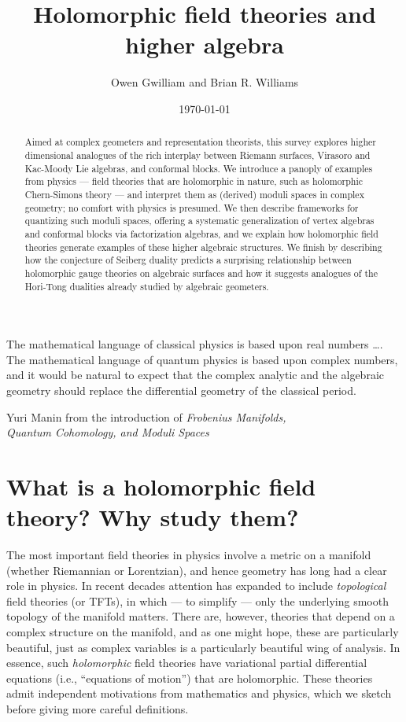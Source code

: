 \documentclass[11pt]{amsart}
\author{Owen Gwilliam and Brian R. Williams}
\date{\today}
\title{Holomorphic field theories and higher algebra}
\begin{document}

\maketitle

\epigraph{The mathematical language of classical physics is based upon real numbers \dots. The mathematical language of quantum physics is based upon complex numbers, and it would be natural to expect that the complex analytic and the algebraic geometry should replace the differential geometry of the classical period.}{Yuri Manin from the introduction of {\it Frobenius Manifolds,\\ Quantum Cohomology, and Moduli Spaces}}

\begin{abstract}
Aimed at complex geometers and representation theorists, this survey explores higher dimensional analogues of the rich interplay between Riemann surfaces, Virasoro and Kac-Moody Lie algebras, and conformal blocks.
We introduce a panoply of examples from physics --- field theories that are holomorphic in nature, such as holomorphic Chern-Simons theory --- and interpret them as (derived) moduli spaces in complex geometry;
no comfort with physics is presumed.
We then describe frameworks for quantizing such moduli spaces, 
offering a systematic generalization of vertex algebras and conformal blocks via factorization algebras,
and we explain how holomorphic field theories generate examples of these higher algebraic structures.
We finish by describing how the conjecture of Seiberg duality predicts a surprising relationship between holomorphic gauge theories on algebraic surfaces and how it suggests analogues of the Hori-Tong dualities already studied by algebraic geometers.
\end{abstract}

\tableofcontents



\section{What is a holomorphic field theory? Why study them?}

The most important field theories in physics involve a metric on a manifold (whether Riemannian or Lorentzian), and hence geometry has long had a clear role in physics.
In recent decades attention has expanded to include {\em topological} field theories (or TFTs), 
in which --- to simplify --- only the underlying smooth topology of the manifold matters.
There are, however, theories that depend on a complex structure on the manifold,
and as one might hope, these are particularly beautiful, 
just as complex variables is a particularly beautiful wing of analysis.
In essence, such {\em holomorphic} field theories have variational partial differential equations (i.e., ``equations of motion'') that are holomorphic.
These theories admit independent motivations from mathematics and physics,
which we sketch before giving more careful definitions.
\end{document}
